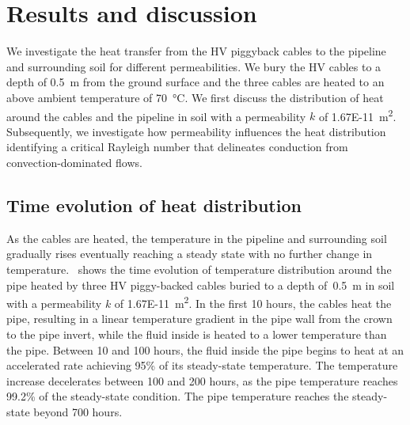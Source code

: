 \documentclass[Journal,letterpaper,InsideFigs]{ascelike-new}
\begin{document}
\pagebreak
\section{Results and discussion}
We investigate the heat transfer from the HV piggyback cables to the pipeline and surrounding soil for different permeabilities. We bury the HV cables to a depth of \SI{0.5}{\meter} from the ground surface and the three cables are heated to an above ambient temperature of \SI{70}{\celsius}. We first discuss the distribution of heat around the cables and the pipeline in soil with a permeability $k$ of \SI{1.67E-11}{\meter\squared}.  Subsequently, we investigate how permeability influences the heat distribution identifying a critical Rayleigh number that delineates conduction from convection-dominated flows. 

\subsection*{Time evolution of heat distribution}
As the cables are heated, the temperature in the pipeline and surrounding soil gradually rises eventually reaching a steady state with no further change in temperature.~ shows the time evolution of temperature distribution around the pipe heated by three HV piggy-backed cables buried to a depth of~\SI{0.5}{\meter} in soil with a permeability $k$ of \SI{1.67E-11}{\meter\squared}. In the first 10 hours, the cables heat the pipe, resulting in a linear temperature gradient in the pipe wall from the crown to the pipe invert, while the fluid inside is heated to a lower temperature than the pipe. Between 10 and 100 hours, the fluid inside the pipe begins to heat at an accelerated rate achieving 95\% of its steady-state temperature. The temperature increase decelerates between 100 and 200 hours, as the pipe temperature reaches 99.2\% of the steady-state condition. The pipe temperature reaches the steady-state beyond 700 hours. 
\end{document}
